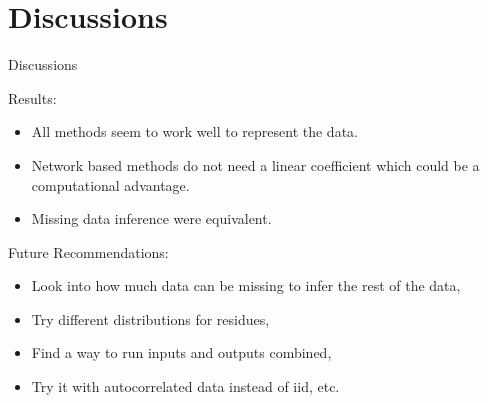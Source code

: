 \documentclass{beamer}
\begin{document}
\section{Discussions}

\begin{frame}{Discussions}

  Results:
  \begin{itemize}
  \item All methods seem to work well to represent the data.
  \item Network based methods do not need a linear coefficient which could be a computational advantage.
  \item Missing data inference were equivalent.
  \end{itemize} 

  \pause
  Future Recommendations:
  \begin{itemize}
  \item Look into how much data can be missing to infer the rest of the data,
  \item Try different distributions for residues,
  \item Find a way to run inputs and outputs combined,
  \item Try it with autocorrelated data instead of iid, etc.
  \end{itemize}

\end{frame}
\end{document}
